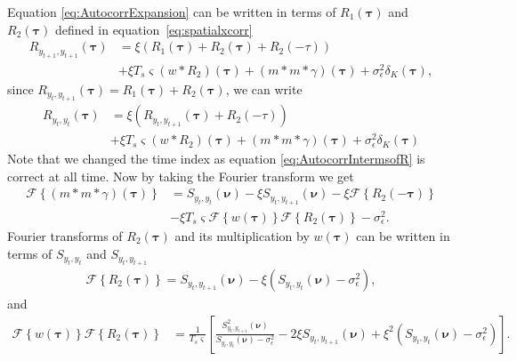 \documentclass[]{article}
\begin{document}
Equation \ref{eq:AutocorrExpansion} can be written in terms of $R_1\left(\boldsymbol\tau\right)$ and $R_2\left(\boldsymbol\tau\right)$ defined in equation~\ref{eq:spatialxcorr}
\begin{align}
R_{y_{t+1},y_{t+1}}(\boldsymbol{\tau}) &=\xi \left(R_1\left(\boldsymbol\tau\right)+ R_2\left(\boldsymbol\tau\right)+R_2\left(\boldsymbol-\tau\right)\right) \nonumber \\
&+\xi T_s \varsigma\left(w\ast R_2\right)\left(\boldsymbol\tau\right)+\left(m\ast m \ast \gamma\right)\left(\boldsymbol\tau\right)+\sigma_{\epsilon}^2\delta_{K}\left(\boldsymbol\tau\right),\label{eq:AutocorrIntermsofR}
\end{align}
 since $R_{y_{t},y_{t+1}}(\boldsymbol{\tau})=R_1\left(\boldsymbol\tau\right)+ R_2\left(\boldsymbol\tau\right)$, we can write
\begin{align}
R_{y_{t},y_{t}}(\boldsymbol{\tau}) &=\xi \left(R_{y_{t},y_{t+1}}(\boldsymbol{\tau})+R_2\left(\boldsymbol-\tau\right)\right) \nonumber \\
&+\xi T_s \varsigma\left(w\ast R_2\right)\left(\boldsymbol\tau\right)+\left(m\ast m \ast \gamma\right)\left(\boldsymbol\tau\right)+\sigma_{\epsilon}^2\delta_{K}\left(\boldsymbol\tau\right)
\end{align}
Note that we changed the time index as equation \ref{eq:AutocorrIntermsofR} is correct at all time. Now by taking the Fourier transform we get
\begin{align}
 \mathcal{F}\left\{\left(m\ast m\ast \gamma\right)\left(\boldsymbol\tau\right)\right\}&=S_{y_{t},y_{t}}\left(\boldsymbol\nu\right)-\xi S_{y_{t},y_{t+1}}\left(\boldsymbol\nu\right)-\xi \mathcal{F}\left\{R_2\left(-\boldsymbol\tau\right)\right\} \nonumber\\
&-\xi T_s \varsigma  \mathcal{F}\left\{w\left(\boldsymbol\tau\right)\right\}\mathcal{F}\left\{R_2\left(\boldsymbol\tau\right)\right\}-\sigma_{\epsilon}^2. \label{eq:SensorsConvgamma}
\end{align}
Fourier transforms of $R_2\left(\boldsymbol\tau\right)$ and its multiplication by  $w\left(\boldsymbol\tau\right)$ can be written in terms of $S_{y_{t},y_{t}}$ and $S_{y_{t},y_{t+1}}$
\begin{align}
 \mathcal{F}\left\{R_2\left(\boldsymbol\tau\right)\right\}=S_{y_{t},y_{t+1}}\left(\boldsymbol\nu\right)-\xi \left(S_{y_{t},y_{t}}\left(\boldsymbol\nu\right)-\sigma_{\epsilon}^2\right),
\end{align}
and
\begin{align}
 \mathcal{F}\left\{w\left(\boldsymbol\tau\right)\right\}\mathcal{F}\left\{R_2\left(\boldsymbol\tau\right)\right\}&=\frac{1}{T_s \varsigma}\left[\frac{S_{y_{t},y_{t+1}}^2\left(\boldsymbol\nu\right)}{S_{y_{t},y_{t}}\left(\boldsymbol\nu\right)-\sigma_{\epsilon}^2}-2\xi S_{y_{t},y_{t+1}}\left(\boldsymbol\nu\right)+\xi^2\left(S_{y_{t},y_{t}}\left(\boldsymbol\nu\right)-\sigma_{\epsilon}^2\right)\right].
\end{align}
\end{document}
